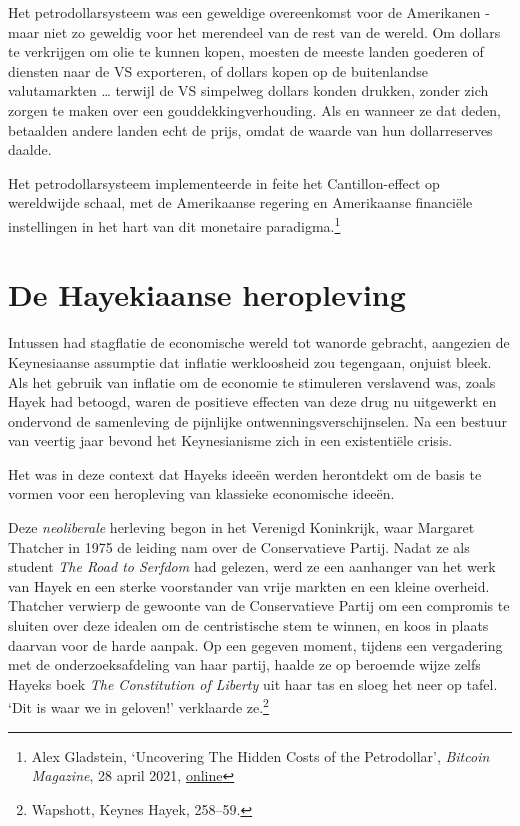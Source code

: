 \documentclass[smalldemyvopaper,11pt,twoside,onecolumn,openright,extrafontsizes,hidelinks]{memoir}
\begin{document}
Het petrodollarsysteem was een geweldige overeenkomst voor de Amerikanen
- maar niet zo geweldig voor het merendeel van de rest van de wereld. Om
dollars te verkrijgen om olie te kunnen kopen, moesten de meeste landen
goederen of diensten naar de VS exporteren, of dollars kopen op de
buitenlandse valutamarkten \ldots{} terwijl de VS simpelweg dollars
konden drukken, zonder zich zorgen te maken over een
gouddekkingverhouding. Als en wanneer ze dat deden, betaalden andere
landen echt de prijs, omdat de waarde van hun dollarreserves daalde.

Het petrodollarsysteem implementeerde in feite het Cantillon-effect op
wereldwijde schaal, met de Amerikaanse regering en Amerikaanse
financiële instellingen in het hart van dit monetaire
paradigma.\footnote{Alex Gladstein, `Uncovering The Hidden Costs of the
  Petrodollar', \emph{Bitcoin Magazine}, 28 april 2021,
  \href{https://bitcoinmagazine.com/culture/the-hidden-costs-of-the-petrodollar}{online}}

\section{De Hayekiaanse heropleving}\label{de-hayekiaanse-heropleving}

Intussen had stagflatie de economische wereld tot wanorde gebracht,
aangezien de Keynesiaanse assumptie dat inflatie werkloosheid zou
tegengaan, onjuist bleek. Als het gebruik van inflatie om de economie te
stimuleren verslavend was, zoals Hayek had betoogd, waren de positieve
effecten van deze drug nu uitgewerkt en ondervond de samenleving de
pijnlijke ontwenningsverschijnselen. Na een bestuur van veertig jaar
bevond het Keynesianisme zich in een existentiële crisis.

Het was in deze context dat Hayeks ideeën werden herontdekt om de basis
te vormen voor een heropleving van klassieke economische ideeën.

Deze \emph{neoliberale} herleving begon in het Verenigd Koninkrijk, waar
Margaret Thatcher in 1975 de leiding nam over de Conservatieve Partij.
Nadat ze als student \emph{The Road to Serfdom} had gelezen, werd ze een
aanhanger van het werk van Hayek en een sterke voorstander van vrije
markten en een kleine overheid. Thatcher verwierp de gewoonte van de
Conservatieve Partij om een compromis te sluiten over deze idealen om de
centristische stem te winnen, en koos in plaats daarvan voor de harde
aanpak. Op een gegeven moment, tijdens een vergadering met de
onderzoeksafdeling van haar partij, haalde ze op beroemde wijze zelfs
Hayeks boek \emph{The Constitution of Liberty} uit haar tas en sloeg het
neer op tafel. `Dit is waar we in geloven!' verklaarde ze.\footnote{Wapshott,
  Keynes Hayek, 258--59.}
\end{document}
